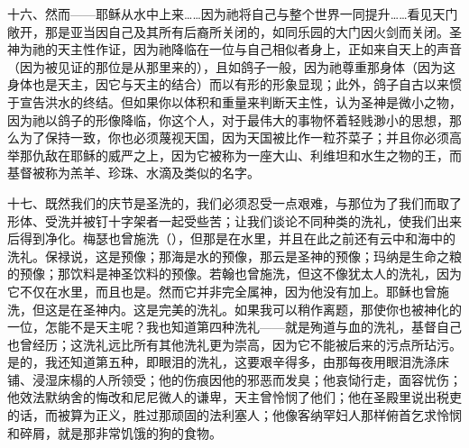 十六、然而——耶稣从水中上来……因为祂将自己与整个世界一同提升……看见天门敞开，那是亚当因自己及其所有后裔所关闭的，如同乐园的大门因火剑而关闭。圣神为祂的天主性作证，因为祂降临在一位与自己相似者身上，正如来自天上的声音（因为被见证的那位是从那里来的），且如鸽子一般，因为祂尊重那身体（因为这身体也是天主，因它与天主的结合）而以有形的形象显现；此外，鸽子自古以来惯于宣告洪水的终结。但如果你以体积和重量来判断天主性，认为圣神是微小之物，因为祂以鸽子的形像降临，你这个人，对于最伟大的事物怀着轻贱渺小的思想，那么为了保持一致，你也必须蔑视天国，因为天国被比作一粒芥菜子；并且你必须高举那仇敌在耶稣的威严之上，因为它被称为一座大山、利维坦和水生之物的王，而基督被称为羔羊、珍珠、水滴及类似的名字。\par

十七、既然我们的庆节是圣洗的，我们必须忍受一点艰难，与那位为了我们而取了形体、受洗并被钉十字架者一起受些苦；让我们谈论不同种类的洗礼，使我们出来后得到净化。梅瑟也曾施洗（），但那是在水里，并且在此之前还有云中和海中的洗礼。保禄说，这是预像；那海是水的预像，那云是圣神的预像；玛纳是生命之粮的预像；那饮料是神圣饮料的预像。若翰也曾施洗，但这不像犹太人的洗礼，因为它不仅在水里，而且也是。然而它并非完全属神，因为他没有加上。耶稣也曾施洗，但这是在圣神内。这是完美的洗礼。如果我可以稍作离题，那使你也被神化的一位，怎能不是天主呢？我也知道第四种洗礼——就是殉道与血的洗礼，基督自己也曾经历；这洗礼远比所有其他洗礼更为崇高，因为它不能被后来的污点所玷污。是的，我还知道第五种，即眼泪的洗礼，这要艰辛得多，由那每夜用眼泪洗涤床铺、浸湿床榻的人所领受；他的伤痕因他的邪恶而发臭；他哀恸行走，面容忧伤；他效法默纳舍的悔改和尼尼微人的谦卑，天主曾怜悯了他们；他在圣殿里说出税吏的话，而被算为正义，胜过那顽固的法利塞人；他像客纳罕妇人那样俯首乞求怜悯和碎屑，就是那非常饥饿的狗的食物。\par

